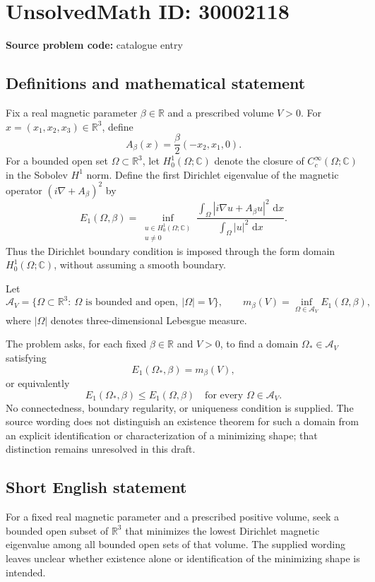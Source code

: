 \documentclass[11pt]{article}
\newcommand{\R}{\mathbb{R}}
\newcommand{\C}{\mathbb{C}}
\newcommand{\dd}{\,\mathrm{d}}
\begin{document}
\section*{UnsolvedMath ID: 30002118}
\textbf{Source problem code:} catalogue entry
\subsection{Definitions and mathematical statement}
Fix a real magnetic parameter \(\beta\in\R\) and a prescribed volume \(V>0\). For \(x=(x_1,x_2,x_3)\in\R^3\), define
\[
A_\beta(x)=\frac{\beta}{2}(-x_2,x_1,0).
\]
For a bounded open set \(\Omega\subset\R^3\), let \(H_0^1(\Omega;\C)\) denote the closure of \(C_c^\infty(\Omega;\C)\) in the Sobolev \(H^1\) norm. Define the first Dirichlet eigenvalue of the magnetic operator \((i\nabla+A_\beta)^2\) by
\[
E_1(\Omega,\beta)
=
\inf_{\substack{u\in H_0^1(\Omega;\C)\\u\ne0}}
\frac{\displaystyle\int_\Omega
\left|i\nabla u+A_\beta u\right|^2\,\dd x}
{\displaystyle\int_\Omega |u|^2\,\dd x}.
\]
Thus the Dirichlet boundary condition is imposed through the form domain \(H_0^1(\Omega;\C)\), without assuming a smooth boundary.

Let
\[
\mathcal A_V
=\{\Omega\subset\R^3:\ \Omega\text{ is bounded and open},\ |\Omega|=V\},
\qquad
m_\beta(V)=\inf_{\Omega\in\mathcal A_V}E_1(\Omega,\beta),
\]
where \(|\Omega|\) denotes three-dimensional Lebesgue measure.

The problem asks, for each fixed \(\beta\in\R\) and \(V>0\), to find a domain \(\Omega_*\in\mathcal A_V\) satisfying
\[
E_1(\Omega_*,\beta)=m_\beta(V),
\]
or equivalently
\[
E_1(\Omega_*,\beta)\le E_1(\Omega,\beta)
\quad\text{for every }\Omega\in\mathcal A_V.
\]
No connectedness, boundary regularity, or uniqueness condition is supplied. The source wording does not distinguish an existence theorem for such a domain from an explicit identification or characterization of a minimizing shape; that distinction remains unresolved in this draft.
\subsection{Short English statement}
For a fixed real magnetic parameter and a prescribed positive volume, seek a bounded open subset of \(\R^3\) that minimizes the lowest Dirichlet magnetic eigenvalue among all bounded open sets of that volume. The supplied wording leaves unclear whether existence alone or identification of the minimizing shape is intended.
\end{document}
